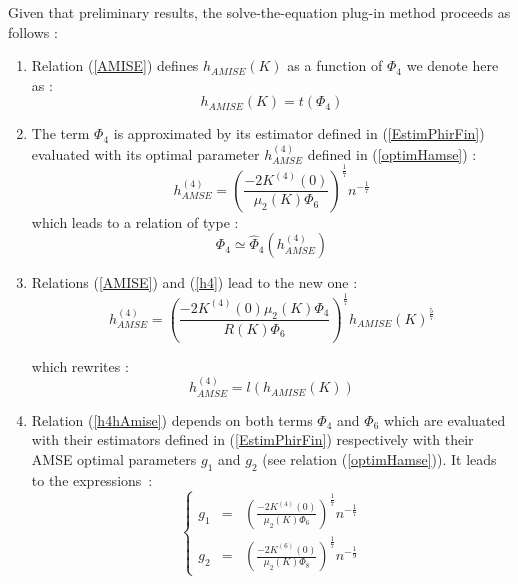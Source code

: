 {  Given that preliminary results, the solve-the-equation plug-in method  proceeds as follows :
  \begin{enumerate}
  \item Relation (\ref{AMISE}) defines $h_{AMISE}(K)$ as a function of $\Phi_4$ we denote here as :
    \begin{equation}
      \label{rel1}
      h_{AMISE}(K) = t(\Phi_4)
    \end{equation}
  \item The term  $\Phi_4$ is approximated by its estimator defined in (\ref{EstimPhirFin}) evaluated with its optimal parameter $h^{(4)}_{AMSE}$ defined in (\ref{optimHamse}) :
    \begin{equation}
      \label{h4}
      h^{(4)}_{AMSE} = \displaystyle \left(\frac{-2K^{(4)}(0)}{\mu_2(K)\Phi_{6}}\right)^{\frac{1}{7}}n^{-\frac{1}{7}}
    \end{equation}
    which leads to a relation of type :
    \begin{equation}
      \label{rel2}
      \Phi_4 \simeq  \hat{\Phi}_4(h^{(4)}_{AMSE})
    \end{equation}

  \item Relations (\ref{AMISE}) and (\ref{h4}) lead to the new one :
    \begin{equation}
      \label{h4hAmise}
      h^{(4)}_{AMSE} = \displaystyle \left( \frac{-2K^{(4)}(0)\mu_2(K)\Phi_4}{R(K)\Phi_{6}}\right) ^{\frac{1}{7}}h_{AMISE}(K)^{\frac{5}{7}}
    \end{equation}

    which rewrites :
    \begin{equation}
      \label{rel3}
      h^{(4)}_{AMSE} = l(h_{AMISE}(K))
    \end{equation}

  \item Relation (\ref{h4hAmise}) depends on both terms $\Phi_4$ and $\Phi_6$ which are evaluated with their estimators defined in (\ref{EstimPhirFin}) respectively with their AMSE optimal parameters $g_1$ and $g_2$ (see relation (\ref{optimHamse})).  It leads to the expressions~:
    \begin{equation}
      \label{g12}
      \left\{
        \begin{array}{lcl}
          g_1 & = & \displaystyle \left(\frac{-2K^{(4)}(0)}{\mu_2(K)\Phi_{6}}\right)^{\frac{1}{7}}n^{-\frac{1}{7}}\\
          g_2 & = & \displaystyle \left(\frac{-2K^{(6)}(0)}{\mu_2(K)\Phi_{8}}\right)^{\frac{1}{7}}n^{-\frac{1}{9}}
        \end{array}
      \right.
    \end{equation}


\end{enumerate}}
